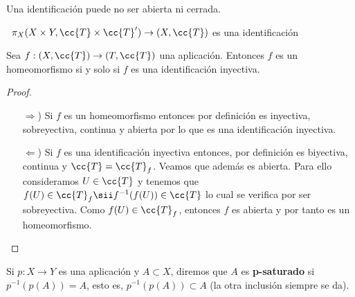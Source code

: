\begin{observacion}
    Una identificación puede no ser abierta ni cerrada.
    \endsquare
\end{observacion}


\begin{ejemplo}\
    $\pi_X(X\times Y, \cc{T}\times \cc{T}')\to (X, \cc{T})$ es una identificación
    \endsquare
\end{ejemplo}

\begin{coro}
    Sea $f:(X, \cc{T})\to (T, \cc{T})$ una aplicación. Entonces $f$ es un homeomorfismo si y solo si $f$ es una identificación inyectiva.
    \begin{proof}\
        \begin{itemize}
            \item[$\Rightarrow$)] Si $f$ es un homeomorfismo entonces por definición es inyectiva, sobreyectiva, continua y abierta por lo que es una identificación inyectiva.
            \item[$\Leftarrow$)] Si $f$ es una identificación inyectiva entonces, por definición es biyectiva, continua y $\cc{T}=\cc{T}_f$. Veamos que además es abierta. Para ello consideramos $U\in \cc{T}$ y tenemos que $f(U)\in \cc{T}_f \sii f^{-1}(f(U))\in \cc{T}$ lo cual se verifica por ser sobreyectiva. Como $f(U)\in \cc{T}_f$, entonces $f$ es abierta y por tanto es un homeomorfismo.
        \end{itemize}
    \end{proof}
\end{coro}

\begin{definicion}
    Si $p:X\to Y$ es una aplicación y $A\subset X$, diremos que $A$ es \textbf{p-saturado} si $p^{-1}(p(A))=A$, esto es, $p^{-1}(p(A))\subset A$ (la otra inclusión siempre se da).
    \endsquare
\end{definicion}

